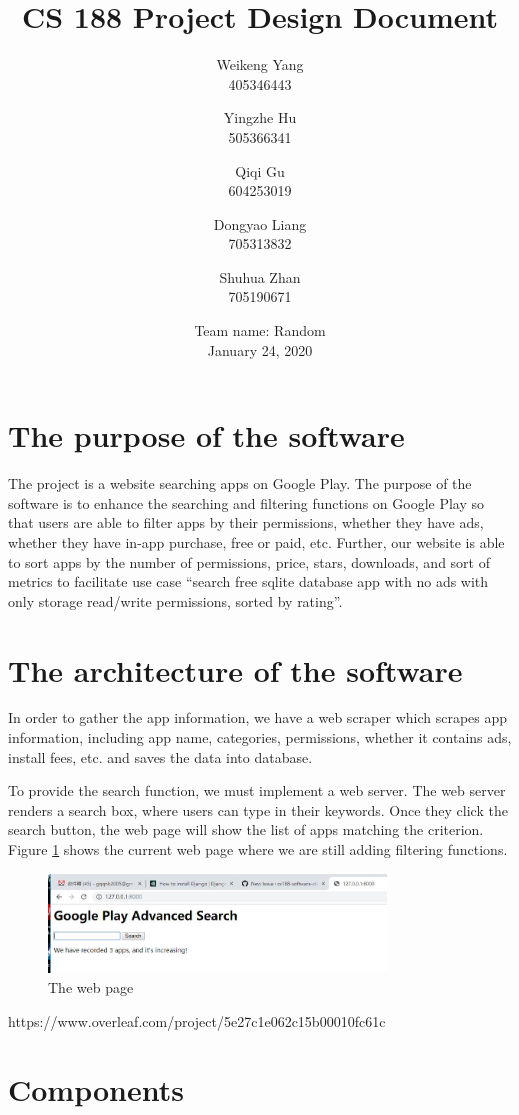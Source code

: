 \documentclass[12pt, a4paper]{article}
\title{CS 188 Project Design Document}
\author{Weikeng Yang\\405346443 \and
Yingzhe Hu\\505366341 \and
Qiqi Gu\\604253019 \and
Dongyao Liang\\705313832 \and
Shuhua Zhan\\705190671}
\date{Team name: Random\\[2mm]January 24, 2020}
\begin{document}
\maketitle




\section{The purpose of the software}
The project is a website searching apps on Google Play. The purpose of the software is to enhance the searching and filtering functions on Google Play so that users are able to filter apps by their permissions, whether they have ads, whether they have in-app purchase, free or paid, etc. Further, our website is able to sort apps by the number of permissions, price, stars, downloads, and sort of metrics to facilitate use case “search free sqlite database app with no ads with only storage read/write permissions, sorted by rating”.

\section{The architecture of the software}
In order to gather the app information, we have a web scraper which scrapes app information, including app name, categories, permissions, whether it contains ads, install fees, etc. and saves the data into database. 

To provide the search function, we must implement a web server. The web server renders a search box, where users can type in their keywords. Once they click the search button, the web page will show the list of apps matching the criterion. Figure \ref{fig:search-interface} shows the current web page where we are still adding filtering functions.

\begin{figure}[ht]
\centering
\includegraphics[width=0.8\textwidth]{search-interface.jpg}
\caption{The web page}
\label{fig:search-interface}
\end{figure}https://www.overleaf.com/project/5e27c1e062c15b00010fc61c

\section{Components}
\end{document}
